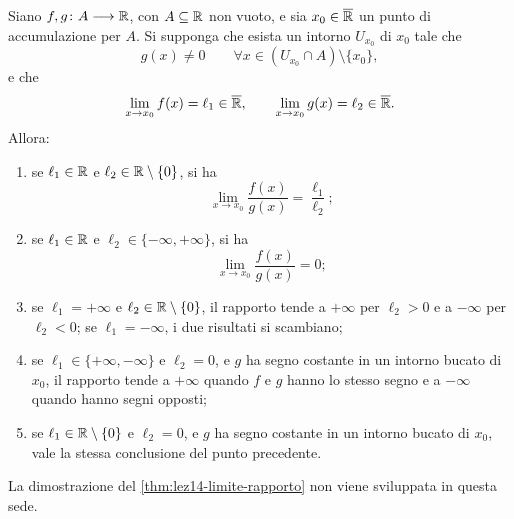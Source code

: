 \begin{theorem}
\label{thm:lez14-limite-rapporto}
Siano \(f,g\colon A\longrightarrow\mathbb{R}\), con
\(A\subseteq\mathbb{R}\) non vuoto, e sia
\(x_0\in\overline{\mathbb{R}}\) un punto di accumulazione per \(A\).
Si supponga che esista un intorno \(U_{x_0}\) di \(x_0\)
tale che
\[
  g(x)\ne0
  \qquad\forall x\in(U_{x_0}\cap A)\setminus\{x_0\},
\]
e che
\[
  \lim_{x\to x_0}f(x)=\ell_1\in\overline{\mathbb{R}},
  \qquad
  \lim_{x\to x_0}g(x)=\ell_2\in\overline{\mathbb{R}}.
\]
Allora:
\begin{enumerate}
  \item se \(\ell_1\in\mathbb{R}\) e \(\ell_2\in\mathbb{R}\setminus\{0\}\),
  si ha
  \[
    \lim_{x\to x_0}\frac{f(x)}{g(x)}=\frac{\ell_1}{\ell_2};
  \]
  \item se \(\ell_1\in\mathbb{R}\) e
  \(\ell_2\in\{-\infty,+\infty\}\), si ha
  \[
    \lim_{x\to x_0}\frac{f(x)}{g(x)}=0;
  \]
  \item se \(\ell_1=+\infty\) e \(\ell_2\in\mathbb{R}\setminus\{0\}\),
  il rapporto tende a \(+\infty\) per \(\ell_2>0\) e a
  \(-\infty\) per \(\ell_2<0\); se \(\ell_1=-\infty\),
  i due risultati si scambiano;
  \item se \(\ell_1\in\{+\infty,-\infty\}\) e \(\ell_2=0\),
  e \(g\) ha segno costante in un intorno bucato di \(x_0\),
  il rapporto tende a \(+\infty\) quando \(f\) e \(g\)
  hanno lo stesso segno e a \(-\infty\) quando hanno
  segni opposti;
  \item se \(\ell_1\in\mathbb{R}\setminus\{0\}\) e \(\ell_2=0\),
  e \(g\) ha segno costante in un intorno bucato di \(x_0\),
  vale la stessa conclusione del punto precedente.
\end{enumerate}
\end{theorem}

La dimostrazione del \cref{thm:lez14-limite-rapporto}
non viene sviluppata in questa sede.


